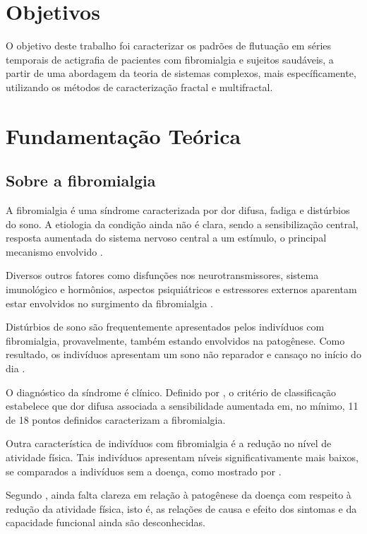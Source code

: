 \documentclass{ufscThesis}
\begin{document}
\chapter{Objetivos}

O objetivo deste trabalho foi caracterizar os padrões de flutuação em séries temporais de actigrafia de pacientes com fibromialgia e sujeitos saudáveis, a partir de uma abordagem da teoria de sistemas complexos, mais específicamente, utilizando os métodos de caracterização fractal e multifractal.\par


\chapter{Fundamentação Teórica}

\section{Sobre a fibromialgia}

A fibromialgia é uma síndrome caracterizada por dor difusa, fadiga e distúrbios do sono. A etiologia da condição ainda não é clara, sendo a sensibilização central, resposta aumentada do sistema nervoso central a um estímulo, o principal mecanismo envolvido \cite{Bellato2012, McLoughlin2011}. \par 
Diversos outros fatores como disfunções nos neurotransmissores, sistema imunológico e hormônios, aspectos psiquiátricos e estressores externos aparentam estar envolvidos no surgimento da fibromialgia \cite{Bellato2012}. \par
Distúrbios de sono são frequentemente apresentados pelos indivíduos com fibromialgia, provavelmente, também estando envolvidos na patogênese. Como resultado, os indivíduos apresentam um sono não reparador e cansaço no início do dia \cite{Bellato2012, McLoughlin2011}. \par
O diagnóstico da síndrome é clínico. Definido por , o critério de classificação estabelece que dor difusa associada a sensibilidade aumentada em, no mínimo, 11 de 18 pontos definidos caracterizam a fibromialgia. \par
Outra característica de indivíduos com fibromialgia é a redução no nível de atividade física. Tais indivíduos apresentam níveis significativamente mais baixos, se comparados a indivíduos sem a doença, como mostrado por . \par
Segundo , ainda falta clareza em relação à patogênese da doença com respeito à redução da atividade física, isto é, as relações de causa e efeito dos sintomas e da capacidade funcional ainda são desconhecidas.
\end{document}

